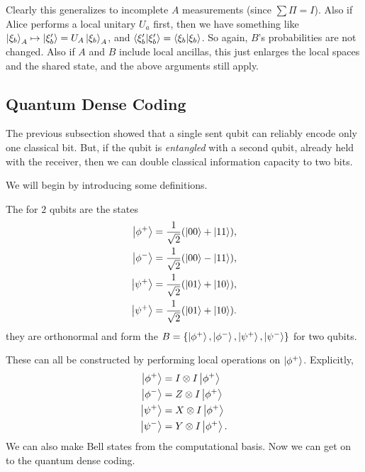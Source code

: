 \documentclass[a4paper]{article}
\begin{document}
\begin{remark}
	Clearly this generalizes to incomplete $A$ measurements (since $\sum \Pi = I$). Also if Alice performs a local unitary $U_a$ first, then we have something like $\ket{\xi_b}_A \mapsto \ket{\xi_b'} = U_A\ket{\xi_b}_A$, and $\ip{\xi_b'}{\xi_b'} = \ip{\xi_b}{\xi_b}$. So again, $B$'s probabilities are not changed.
	Also if $A$ and $B$ include local ancillas, this just enlarges the local spaces and the shared state, and the above arguments still apply.
\end{remark}

\subsection{Quantum Dense Coding}

The previous subsection showed that a single sent qubit can reliably encode only one classical bit. But, if the qubit is \emph{entangled} with a second qubit, already held with the receiver, then we can double classical information capacity to two bits. 

We will begin by introducing some definitions.

\begin{definition}
	The  for $2$ qubits are the states
	\begin{align*}
		\ket{\phi^+} &= \frac{1}{\sqrt{2}}(\ket{00} + \ket{11}), \\
		\ket{\phi^-} &= \frac{1}{\sqrt{2}}(\ket{00} - \ket{11}), \\
		\ket{\psi^+} &= \frac{1}{\sqrt{2}}(\ket{01} + \ket{10}), \\
		\ket{\psi^+} &= \frac{1}{\sqrt{2}}(\ket{01} + \ket{10}).
	\end{align*}
	they are orthonormal and form the  $B = \{\ket{\phi^+}, \ket{\phi^-}, \ket{\psi^+}, \ket{\psi^-}\}$ for two qubits.
\end{definition}

These can all be constructed by performing local operations on $\ket{\phi^+}$. Explicitly,
\begin{align*}
	\ket{\phi^+} &= I \otimes I \ket{\phi^+} \\
	\ket{\phi^-} &= Z \otimes I \ket{\phi^+} \\
	\ket{\psi^+} &= X \otimes I \ket{\phi^+} \\
	\ket{\psi^-} &= Y \otimes I \ket{\phi^+}.
\end{align*}
We can also make Bell states from the computational basis. Now we can get on to the quantum dense coding.
\end{document}
